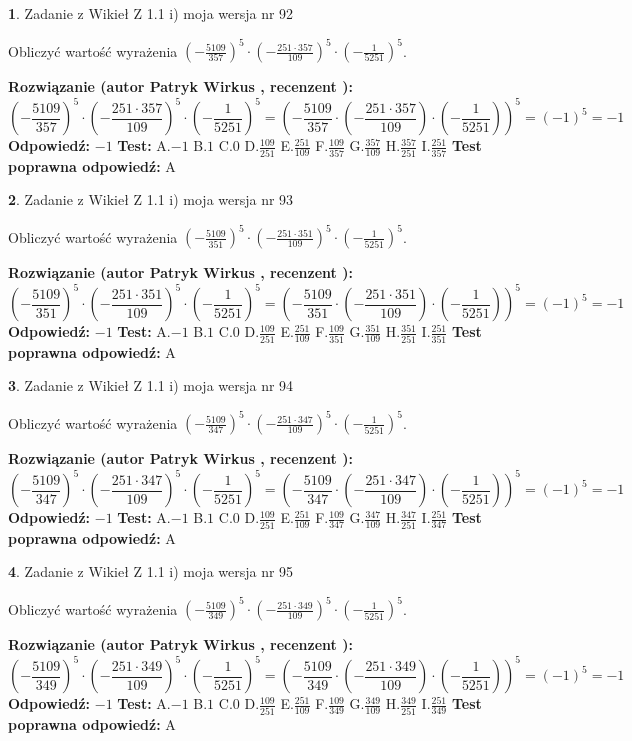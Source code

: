 \documentclass[12pt, a4paper]{article}
\theoremstyle{definition} %
\newtheorem{zad}{}
\newcommand{\zadStart}[1]{\begin{zad}#1\newline}
\newcommand{\zadStop}{\end{zad}}
\newcommand{\rozwStart}[2]{\noindent \textbf{Rozwiązanie (autor #1 , recenzent #2): }\newline}
\newcommand{\rozwStop}{\newline}
\newcommand{\odpStart}{\noindent \textbf{Odpowiedź:}\newline}
\newcommand{\odpStop}{\newline}
\newcommand{\testStart}{\noindent \textbf{Test:}\newline}
\newcommand{\testStop}{\newline}
\newcommand{\kluczStart}{\noindent \textbf{Test poprawna odpowiedź:}\newline}
\newcommand{\kluczStop}{\newline}
\begin{document}
\zadStart{Zadanie z Wikieł Z 1.1 i) moja wersja nr 92}

Obliczyć wartość wyrażenia $(-\frac{5109}{357})^{5} \cdot (-\frac{251 \cdot 357}{109})^{5} \cdot (-\frac{1}{5251})^{5}$.
\zadStop
\rozwStart{Patryk Wirkus}{}
$$(-\frac{5109}{357})^{5} \cdot (-\frac{251 \cdot 357}{109})^{5} \cdot (-\frac{1}{5251})^{5} = (-\frac{5109}{357} \cdot (-\frac{251 \cdot 357}{109}) \cdot (-\frac{1}{5251}))^{5} = (-1)^{5} = -1$$
\rozwStop
\odpStart
$-1$
\odpStop
\testStart
A.$-1$ B.$1$ C.$0$ D.$\frac{109}{251}$ E.$\frac{251}{109}$
F.$\frac{109}{357}$ G.$\frac{357}{109}$
H.$\frac{357}{251}$
I.$\frac{251}{357}$
\testStop
\kluczStart
A
\kluczStop



\zadStart{Zadanie z Wikieł Z 1.1 i) moja wersja nr 93}

Obliczyć wartość wyrażenia $(-\frac{5109}{351})^{5} \cdot (-\frac{251 \cdot 351}{109})^{5} \cdot (-\frac{1}{5251})^{5}$.
\zadStop
\rozwStart{Patryk Wirkus}{}
$$(-\frac{5109}{351})^{5} \cdot (-\frac{251 \cdot 351}{109})^{5} \cdot (-\frac{1}{5251})^{5} = (-\frac{5109}{351} \cdot (-\frac{251 \cdot 351}{109}) \cdot (-\frac{1}{5251}))^{5} = (-1)^{5} = -1$$
\rozwStop
\odpStart
$-1$
\odpStop
\testStart
A.$-1$ B.$1$ C.$0$ D.$\frac{109}{251}$ E.$\frac{251}{109}$
F.$\frac{109}{351}$ G.$\frac{351}{109}$
H.$\frac{351}{251}$
I.$\frac{251}{351}$
\testStop
\kluczStart
A
\kluczStop



\zadStart{Zadanie z Wikieł Z 1.1 i) moja wersja nr 94}

Obliczyć wartość wyrażenia $(-\frac{5109}{347})^{5} \cdot (-\frac{251 \cdot 347}{109})^{5} \cdot (-\frac{1}{5251})^{5}$.
\zadStop
\rozwStart{Patryk Wirkus}{}
$$(-\frac{5109}{347})^{5} \cdot (-\frac{251 \cdot 347}{109})^{5} \cdot (-\frac{1}{5251})^{5} = (-\frac{5109}{347} \cdot (-\frac{251 \cdot 347}{109}) \cdot (-\frac{1}{5251}))^{5} = (-1)^{5} = -1$$
\rozwStop
\odpStart
$-1$
\odpStop
\testStart
A.$-1$ B.$1$ C.$0$ D.$\frac{109}{251}$ E.$\frac{251}{109}$
F.$\frac{109}{347}$ G.$\frac{347}{109}$
H.$\frac{347}{251}$
I.$\frac{251}{347}$
\testStop
\kluczStart
A
\kluczStop



\zadStart{Zadanie z Wikieł Z 1.1 i) moja wersja nr 95}

Obliczyć wartość wyrażenia $(-\frac{5109}{349})^{5} \cdot (-\frac{251 \cdot 349}{109})^{5} \cdot (-\frac{1}{5251})^{5}$.
\zadStop
\rozwStart{Patryk Wirkus}{}
$$(-\frac{5109}{349})^{5} \cdot (-\frac{251 \cdot 349}{109})^{5} \cdot (-\frac{1}{5251})^{5} = (-\frac{5109}{349} \cdot (-\frac{251 \cdot 349}{109}) \cdot (-\frac{1}{5251}))^{5} = (-1)^{5} = -1$$
\rozwStop
\odpStart
$-1$
\odpStop
\testStart
A.$-1$ B.$1$ C.$0$ D.$\frac{109}{251}$ E.$\frac{251}{109}$
F.$\frac{109}{349}$ G.$\frac{349}{109}$
H.$\frac{349}{251}$
I.$\frac{251}{349}$
\testStop
\kluczStart
A
\kluczStop
\end{document}
